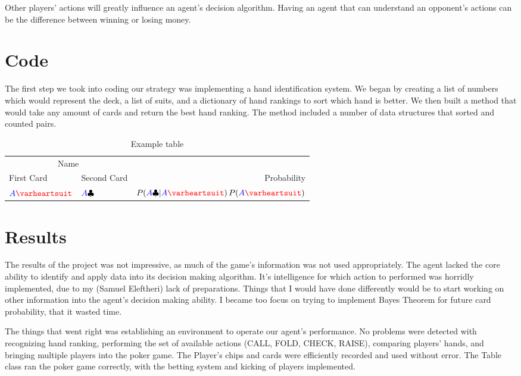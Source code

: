 \documentclass[10pt, a4paper, twocolumn]{article} %
\newcommand*\Hs[1]{\ensuremath{{\color{blue} #1}{\color{red}\varheartsuit}}}
\newcommand*\Cs[1]{\ensuremath{{\color{blue} #1}{\color{black}\clubsuit}}}
\begin{document}
Other players' actions will greatly influence an agent's decision algorithm. Having an agent that can understand an opponent's actions can be the difference between winning or losing money.  

\section{Code}

The first step we took into coding our strategy was implementing a hand identification system. We began by creating a list of numbers which would represent the deck, a list of suits, and a dictionary of hand rankings to sort which hand is better. We then built a method that would take any amount of cards and return the best hand ranking. The method included a number of data structures that sorted and counted pairs.
\begin{table}
	\caption{Example table}
	\centering
	\begin{tabular}{llr}
		\toprule
		\multicolumn{2}{c}{Name} \\
		\cmidrule(r){1-2}
		First Card & Second Card  & Probability \\
		\midrule
		\Hs{A} & \Cs{A} & $P(\Cs{A}|\Hs{A})\,P(\Hs{A})$ \\
		\bottomrule
	\end{tabular}
\end{table}


\section{Results}

The results of the project was not impressive, as much of the game's information was not used appropriately. The agent lacked the core ability to identify and apply data into its decision making algorithm. It's intelligence for which action to performed was horridly implemented, due to my (Samuel Eleftheri) lack of preparations. Things that I would have done differently would be to start working on other information into the agent's decision making ability. I became too focus on trying to implement Bayes Theorem for future card probability, that it wasted time. 

The things that went right was establishing an environment to operate our agent's performance. No problems were detected with recognizing hand ranking, performing the set of available actions (CALL, FOLD, CHECK, RAISE), comparing players' hands, and bringing multiple players into the poker game. The Player's chips and cards were efficiently recorded and used without error. The Table class ran the poker game correctly, with the betting system and kicking of players implemented. \\ \\ \\ \\ \\
\end{document}
